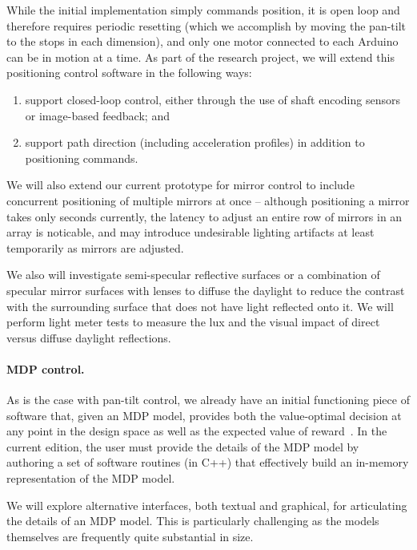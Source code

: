 While the initial implementation simply commands position, it is open loop
and therefore requires periodic resetting (which we accomplish by moving the
pan-tilt to the stops in each dimension), and only one motor 
connected to each Arduino can be in motion at a time.
As part of the research project, we will extend this positioning control
software in the following ways:
\begin{enumerate}

\item support closed-loop control, either through the use of shaft encoding
sensors or image-based feedback; and

\item support path direction (including acceleration profiles) in addition
to positioning commands.

\end{enumerate}

We will also extend our current prototype for mirror control to include concurrent positioning
of multiple mirrors at once -- although positioning a mirror takes only seconds currently,
the latency to adjust an entire row of mirrors in an array is noticable, and may introduce
undesirable lighting artifacts at least temporarily as mirrors are adjusted.

We also will investigate semi-specular reflective surfaces or a combination of specular mirror surfaces with lenses to diffuse the daylight to reduce the contrast with the surrounding surface that does not have light reflected onto it. We will perform light meter tests to measure the lux and the visual impact of direct versus diffuse daylight reflections.

\paragraph{MDP control.}
As is the case with pan-tilt control, we already have an initial functioning
piece of software that, given an MDP model, provides both the
value-optimal decision at any point in the design space as well as
the expected value of reward~\cite{mskgct13,tggs10}.
In the current edition, the user must provide the details of the MDP model
by authoring a set of software routines (in C++) that effectively build
an in-memory representation of the MDP model.

We will explore alternative interfaces, both textual and graphical,
for articulating the details of an MDP model.  This is particularly
challenging as the models themselves are frequently quite substantial
in size.

